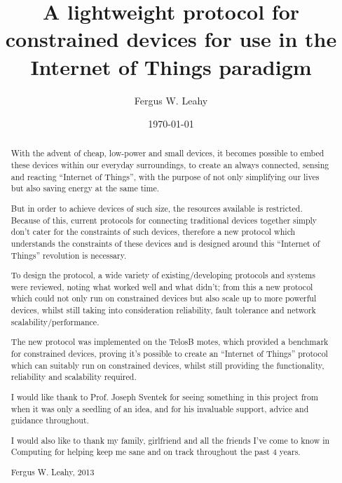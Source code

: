 \documentclass{l4proj}
\begin{document}
\title{A lightweight protocol for constrained devices for use in the Internet of Things paradigm}
\author{Fergus W. Leahy}
\date{\today}
\maketitle

\begin{abstract}
With the advent of cheap, low-power and small devices, it becomes possible to embed these devices within our everyday surroundings, to create an always connected, sensing and reacting ``Internet of Things'', with the purpose of not only simplifying our lives but also saving energy at the same time. 

But in order to achieve devices of such size, the resources available is restricted. Because of this, current protocols for connecting traditional devices together simply don't cater for the constraints of such devices, therefore a new protocol which understands the constraints of these devices and is designed around this ``Internet of Things'' revolution is necessary.

To design the protocol, a wide variety of existing/developing protocols and systems were reviewed, noting what worked well and what didn't; from this a new protocol which could not only run on constrained devices but also scale up to more powerful devices, whilst still taking into consideration reliability, fault tolerance and network scalability/performance.

The new protocol was implemented on the TelosB motes, which provided a benchmark for constrained devices, proving it's possible to create an ``Internet of Things'' protocol which can suitably run on constrained devices, whilst still providing the functionality, reliability and scalability required. 

\end{abstract}

\renewcommand{\abstractname}{Acknowledgements}
\begin{abstract}
I would like thank to Prof. Joseph Sventek for seeing something in this project from when it was only a seedling of an idea, and for his invaluable support, advice and guidance throughout.

\noindent I would also like to thank my family, girlfriend and all the friends I've come to know in Computing for helping keep me sane and on track throughout the past 4 years.

Fergus W. Leahy, 2013
\end{abstract}
\educationalconsent
%
%
\tableofcontents
\end{document}
